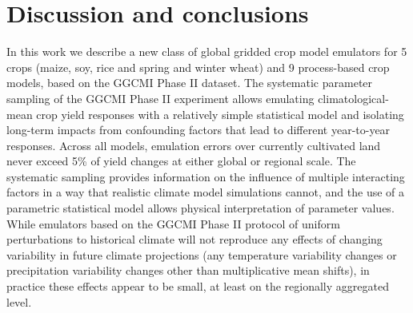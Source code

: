 \documentclass[gmd, manuscript]{copernicus} %
\begin{document}


\section{Discussion and conclusions} 
\label{S:6}
In this work we describe a new class of global gridded crop model emulators for 5 crops (maize, soy, rice and spring and winter wheat) and 9 process-based crop models, based on the  GGCMI Phase II dataset.
The systematic parameter sampling of the GGCMI Phase II experiment allows emulating climatological-mean crop yield responses with a relatively simple statistical model and isolating long-term impacts from confounding factors that lead to different year-to-year responses. 
Across all models, emulation errors over currently cultivated land never exceed 5\% of yield changes at either global or regional scale. 
The systematic sampling provides information on the influence of multiple interacting factors in a way that realistic climate model simulations cannot, and the use of a parametric statistical model allows physical interpretation of parameter values. 
While emulators based on the GGCMI Phase II protocol of uniform perturbations to historical climate will not reproduce any effects of changing variability in future climate projections (any temperature variability changes or precipitation variability changes other than multiplicative mean shifts), in practice these effects appear to be small, at least on the regionally aggregated level. 

\end{document}
